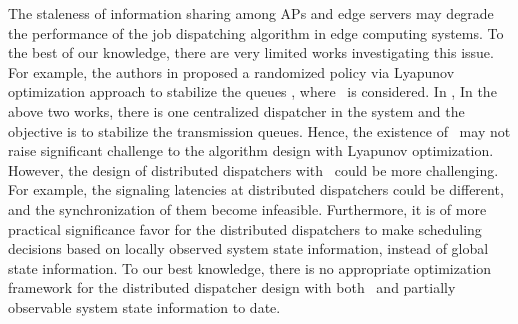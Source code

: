 The staleness of information sharing among APs and edge servers may degrade the performance of the job dispatching algorithm in edge computing systems.
To the best of our knowledge, there are very limited works investigating this issue.
For example, the authors in \cite{JSAC17-LyuX} proposed a randomized policy via Lyapunov optimization approach to stabilize the queues , where \brlatency~is considered. 
In \cite{TWC18-LyuX}, 
In the above two works, there is one centralized dispatcher in the system and the objective is to stabilize the transmission queues.
Hence, the existence of \brlatency~may not raise significant challenge to the algorithm design with Lyapunov optimization.
However, the design of distributed dispatchers with \brlatency~could be more challenging.
For example, the signaling latencies at distributed dispatchers could be different, and the synchronization of them become infeasible.
Furthermore, it is of more practical significance favor for the distributed dispatchers to make scheduling decisions based on locally observed system state information, instead of global state information.
To our best knowledge, there is no appropriate optimization framework for the distributed dispatcher design with both \brlatency~and partially observable system state information to date.

